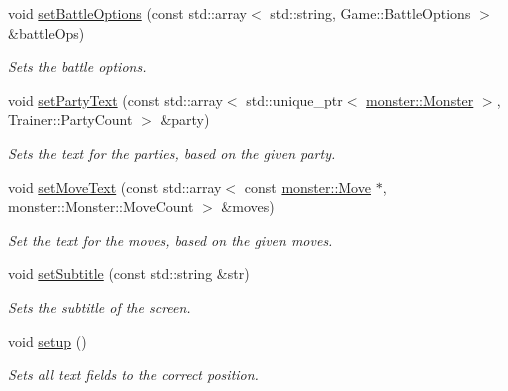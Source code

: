 \begin{DoxyCompactItemize}
\item 
void \hyperlink{classmonsterbattle_1_1DisplayableTextManager_a1b4eb0b21ebf0b2f2123931cf04a63d9}{set\+Battle\+Options} (const std\+::array$<$ std\+::string, Game\+::\+Battle\+Options $>$ \&battle\+Ops)
\begin{DoxyCompactList}\small\item\em Sets the battle options. \end{DoxyCompactList}\item 
void \hyperlink{classmonsterbattle_1_1DisplayableTextManager_a610b7a3a16c6fa9d19f9c35fac4953e8}{set\+Party\+Text} (const std\+::array$<$ std\+::unique\+\_\+ptr$<$ \hyperlink{classmonsterbattle_1_1monster_1_1Monster}{monster\+::\+Monster} $>$, Trainer\+::\+Party\+Count $>$ \&party)
\begin{DoxyCompactList}\small\item\em Sets the text for the parties, based on the given party. \end{DoxyCompactList}\item 
void \hyperlink{classmonsterbattle_1_1DisplayableTextManager_a79f9720047da6253de18072c403997ec}{set\+Move\+Text} (const std\+::array$<$ const \hyperlink{classmonsterbattle_1_1monster_1_1Move}{monster\+::\+Move} $\ast$, monster\+::\+Monster\+::\+Move\+Count $>$ \&moves)
\begin{DoxyCompactList}\small\item\em Set the text for the moves, based on the given moves. \end{DoxyCompactList}\item 
void \hyperlink{classmonsterbattle_1_1DisplayableTextManager_aff93a6dbe74f367739c5c8abe56e5f18}{set\+Subtitle} (const std\+::string \&str)
\begin{DoxyCompactList}\small\item\em Sets the subtitle of the screen. \end{DoxyCompactList}\item 
void \hyperlink{classmonsterbattle_1_1DisplayableTextManager_a0fc6ebabde8ca3c47728f73b76c0549f}{setup} ()
\begin{DoxyCompactList}\small\item\em Sets all text fields to the correct position. \end{DoxyCompactList}\end{DoxyCompactItemize}
